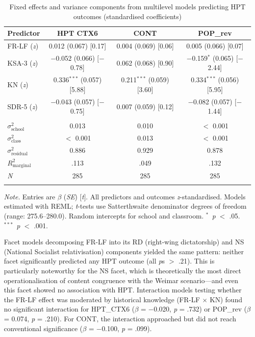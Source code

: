 \documentclass[referee,pdflatex,sn-apa]{sn-jnl}
\begin{document}
\begin{table}[!t]
\caption{Fixed effects and variance components from multilevel models predicting HPT outcomes (standardised coefficients)}\label{tab:fixedeffects}
\begin{tabular}{lccc}
\toprule
Predictor & HPT CTX6 & CONT & POP\_rev \\
\midrule
FR-LF (\textit{z}) & 0.012 (0.067) [0.17] & 0.004 (0.069) [0.06] & 0.005 (0.066) [0.07] \\
KSA-3 (\textit{z}) & $-$0.052 (0.066) [$-$0.78] & 0.062 (0.068) [0.90] & $-$0.159$^{*}$ (0.065) [$-$2.44] \\
KN (\textit{z}) & 0.336$^{***}$ (0.057) [5.88] & 0.211$^{***}$ (0.059) [3.60] & 0.334$^{***}$ (0.056) [5.95] \\
SDR-5 (\textit{z}) & $-$0.043 (0.057) [$-$0.75] & 0.007 (0.059) [0.12] & $-$0.082 (0.057) [$-$1.44] \\
 &  &  &  \\
$\sigma^2_{\text{school}}$ & 0.013 & 0.010 & $<$ 0.001 \\
$\sigma^2_{\text{class}}$ & $<$ 0.001 & 0.013 & $<$ 0.001 \\
$\sigma^2_{\text{residual}}$ & 0.886 & 0.929 & 0.878 \\
$R^2_{\text{marginal}}$ & .113 & .049 & .132 \\
\textit{N} & 285 & 285 & 285 \\
\botrule
\end{tabular}

\medskip\noindent\small\textit{Note.} Entries are $\beta$ (\textit{SE}) [\textit{t}]. All predictors and outcomes \textit{z}-standardised. Models estimated with REML; \textit{t}-tests use Satterthwaite denominator degrees of freedom (range: 275.6--280.0). Random intercepts for school and classroom. $^{*}$~\textit{p} $<$ .05. $^{***}$~\textit{p} $<$ .001.
\end{table}

Facet models decomposing FR-LF into its RD (right-wing dictatorship) and NS (National Socialist relativisation) components yielded the same pattern: neither facet significantly predicted any HPT outcome (all \textit{p}s $>$ .21). This is particularly noteworthy for the NS facet, which is theoretically the most direct operationalisation of content congruence with the Weimar scenario---and even this facet showed no association with HPT. Interaction models testing whether the FR-LF effect was moderated by historical knowledge (FR-LF $\times$ KN) found no significant interaction for HPT\_CTX6 ($\beta$ = $-$0.020, \textit{p} = .732) or POP\_rev ($\beta$ = 0.074, \textit{p} = .210). For CONT, the interaction approached but did not reach conventional significance ($\beta$ = $-$0.100, \textit{p} = .099).
\end{document}
